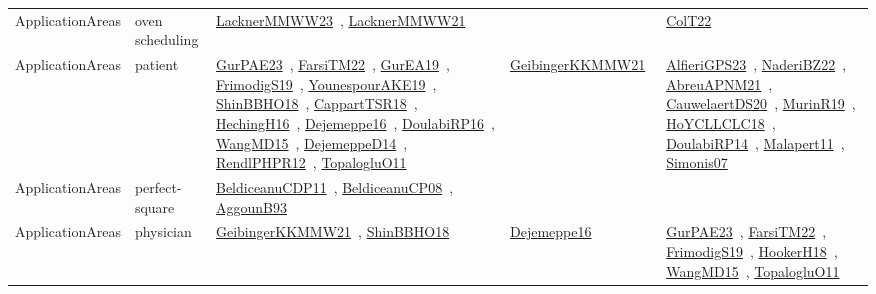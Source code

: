 {\begin{longtable}{lp{3cm}>{\raggedright\arraybackslash}p{6cm}>{\raggedright\arraybackslash}p{6cm}>{\raggedright\arraybackslash}p{8cm}}
ApplicationAreas & oven scheduling & \href{works/LacknerMMWW23.pdf}{LacknerMMWW23}~\cite{LacknerMMWW23}, \href{works/LacknerMMWW21.pdf}{LacknerMMWW21}~\cite{LacknerMMWW21} &  & \href{works/ColT22.pdf}{ColT22}~\cite{ColT22}\\
ApplicationAreas & patient & \href{works/GurPAE23.pdf}{GurPAE23}~\cite{GurPAE23}, \href{works/FarsiTM22.pdf}{FarsiTM22}~\cite{FarsiTM22}, \href{works/GurEA19.pdf}{GurEA19}~\cite{GurEA19}, \href{works/FrimodigS19.pdf}{FrimodigS19}~\cite{FrimodigS19}, \href{works/YounespourAKE19.pdf}{YounespourAKE19}~\cite{YounespourAKE19}, \href{works/ShinBBHO18.pdf}{ShinBBHO18}~\cite{ShinBBHO18}, \href{works/CappartTSR18.pdf}{CappartTSR18}~\cite{CappartTSR18}, \href{works/HechingH16.pdf}{HechingH16}~\cite{HechingH16}, \href{works/Dejemeppe16.pdf}{Dejemeppe16}~\cite{Dejemeppe16}, \href{works/DoulabiRP16.pdf}{DoulabiRP16}~\cite{DoulabiRP16}, \href{works/WangMD15.pdf}{WangMD15}~\cite{WangMD15}, \href{works/DejemeppeD14.pdf}{DejemeppeD14}~\cite{DejemeppeD14}, \href{works/RendlPHPR12.pdf}{RendlPHPR12}~\cite{RendlPHPR12}, \href{works/TopalogluO11.pdf}{TopalogluO11}~\cite{TopalogluO11} & \href{works/GeibingerKKMMW21.pdf}{GeibingerKKMMW21}~\cite{GeibingerKKMMW21} & \href{works/AlfieriGPS23.pdf}{AlfieriGPS23}~\cite{AlfieriGPS23}, \href{works/NaderiBZ22.pdf}{NaderiBZ22}~\cite{NaderiBZ22}, \href{works/AbreuAPNM21.pdf}{AbreuAPNM21}~\cite{AbreuAPNM21}, \href{works/CauwelaertDS20.pdf}{CauwelaertDS20}~\cite{CauwelaertDS20}, \href{works/MurinR19.pdf}{MurinR19}~\cite{MurinR19}, \href{works/HoYCLLCLC18.pdf}{HoYCLLCLC18}~\cite{HoYCLLCLC18}, \href{works/DoulabiRP14.pdf}{DoulabiRP14}~\cite{DoulabiRP14}, \href{works/Malapert11.pdf}{Malapert11}~\cite{Malapert11}, \href{works/Simonis07.pdf}{Simonis07}~\cite{Simonis07}\\
ApplicationAreas & perfect-square & \href{works/BeldiceanuCDP11.pdf}{BeldiceanuCDP11}~\cite{BeldiceanuCDP11}, \href{works/BeldiceanuCP08.pdf}{BeldiceanuCP08}~\cite{BeldiceanuCP08}, \href{works/AggounB93.pdf}{AggounB93}~\cite{AggounB93} &  & \\
ApplicationAreas & physician & \href{works/GeibingerKKMMW21.pdf}{GeibingerKKMMW21}~\cite{GeibingerKKMMW21}, \href{works/ShinBBHO18.pdf}{ShinBBHO18}~\cite{ShinBBHO18} & \href{works/Dejemeppe16.pdf}{Dejemeppe16}~\cite{Dejemeppe16} & \href{works/GurPAE23.pdf}{GurPAE23}~\cite{GurPAE23}, \href{works/FarsiTM22.pdf}{FarsiTM22}~\cite{FarsiTM22}, \href{works/FrimodigS19.pdf}{FrimodigS19}~\cite{FrimodigS19}, \href{works/HookerH18.pdf}{HookerH18}~\cite{HookerH18}, \href{works/WangMD15.pdf}{WangMD15}~\cite{WangMD15}, \href{works/TopalogluO11.pdf}{TopalogluO11}~\cite{TopalogluO11}\\

\end{longtable}}
